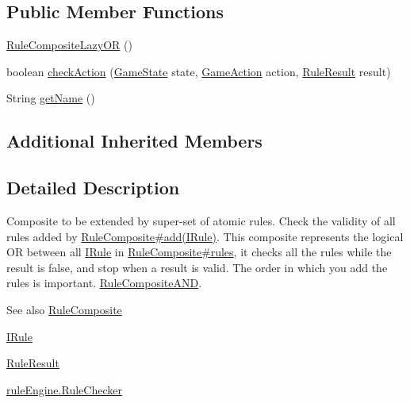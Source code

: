 \subsection*{Public Member Functions}
\begin{DoxyCompactItemize}
\item 
\mbox{\hyperlink{classrule_engine_1_1rules_1_1new_rules_1_1_rule_composite_lazy_o_r_ad93de3b31e4a437048b60f215bb043a0}{Rule\+Composite\+Lazy\+OR}} ()
\item 
boolean \mbox{\hyperlink{classrule_engine_1_1rules_1_1new_rules_1_1_rule_composite_lazy_o_r_a5753ae3a18cd1aab8f34599e47b184b4}{check\+Action}} (\mbox{\hyperlink{classgame_1_1game_state_1_1_game_state}{Game\+State}} state, \mbox{\hyperlink{classrule_engine_1_1_game_action}{Game\+Action}} action, \mbox{\hyperlink{classrule_engine_1_1_rule_result}{Rule\+Result}} result)
\item 
String \mbox{\hyperlink{classrule_engine_1_1rules_1_1new_rules_1_1_rule_composite_lazy_o_r_a54bdce8894ca26eb101d0332686fecf7}{get\+Name}} ()
\end{DoxyCompactItemize}
\subsection*{Additional Inherited Members}


\subsection{Detailed Description}
Composite to be extended by super-\/set of atomic rules. Check the validity of all rules added by \mbox{\hyperlink{classrule_engine_1_1rules_1_1new_rules_1_1_rule_composite_a4970c2904b55542c6c7323195a38c845}{Rule\+Composite\#add(\+I\+Rule)}}. This composite represents the logical OR between all \mbox{\hyperlink{interfacerule_engine_1_1rules_1_1new_rules_1_1_i_rule}{I\+Rule}} in \mbox{\hyperlink{classrule_engine_1_1rules_1_1new_rules_1_1_rule_composite_a0f873c0c52e3cf4815d5b09a5ca2ae7f}{Rule\+Composite\#rules}}, it checks all the rules while the result is false, and stop when a result is valid. The order in which you add the rules is important. \mbox{\hyperlink{classrule_engine_1_1rules_1_1new_rules_1_1_rule_composite_a_n_d}{Rule\+Composite\+A\+ND}}.

\begin{DoxySeeAlso}{See also}
\mbox{\hyperlink{classrule_engine_1_1rules_1_1new_rules_1_1_rule_composite}{Rule\+Composite}} 

\mbox{\hyperlink{interfacerule_engine_1_1rules_1_1new_rules_1_1_i_rule}{I\+Rule}} 

\mbox{\hyperlink{classrule_engine_1_1_rule_result}{Rule\+Result}} 

\mbox{\hyperlink{classrule_engine_1_1_rule_checker}{rule\+Engine.\+Rule\+Checker}} 
\end{DoxySeeAlso}


